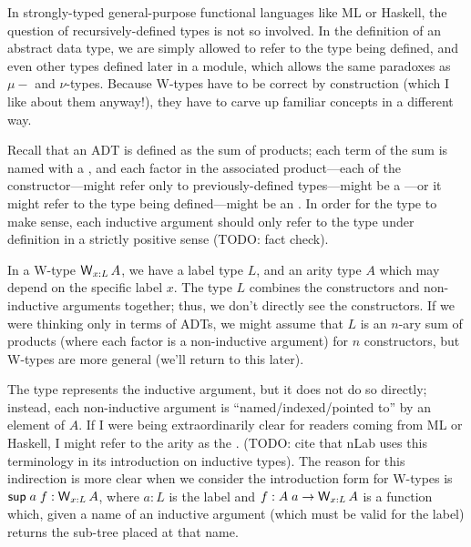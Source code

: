 \documentclass[11pt]{article} %
\theoremstyle{definition}
\theoremstyle{remark}
\newenvironment{aside}
  {\begin{mdframed}[style=0,%
      leftline=false,rightline=false,leftmargin=2em,rightmargin=2em,%
          innerleftmargin=0pt,innerrightmargin=0pt,linewidth=0.75pt,%
      skipabove=7pt,skipbelow=7pt]\small}
  {\end{mdframed}}
\begin{document}
\begin{aside}
  In strongly-typed general-purpose functional languages like ML or Haskell, the question of recursively-defined types is not so involved.
  In the definition of an abstract data type, we are simply allowed to refer to the type being defined, and even other types defined later in a module, which allows the same paradoxes as $\mu-$ and $\nu$-types.
  Because W-types have to be correct by construction (which I like about them anyway!), they have to carve up familiar concepts in a different way.

  Recall that an ADT is defined as the sum of products; each term of the sum is named with a , and each factor in the associated product---each  of the constructor---might refer only to previously-defined types---might be a ---or it might refer to the type being defined---might be an .
  In order for the type to make sense, each inductive argument should only refer to the type under definition in a strictly positive sense (TODO: fact check).

  In a W-type $\operatorname{\mathsf{W}}_{x:L}A$, we have a label type $L$, and an arity type $A$ which may depend on the specific label $x$.
  The  type $L$ combines the constructors and non-inductive arguments together; thus, we don't directly see the constructors.
  If we were thinking only in terms of ADTs, we might assume that $L$ is an $n$-ary sum of products (where each factor is a non-inductive argument) for $n$ constructors, but W-types are more general (we'll return to this later).

  The  type represents the inductive argument, but it does not do so directly; instead, each non-inductive argument is ``named/indexed/pointed to'' by an element of $A$.
  If I were being extraordinarily clear for readers coming from ML or Haskell, I might refer to the arity as the .
  (TODO: cite that nLab uses this terminology in its introduction on inductive types).
  The reason for this indirection is more clear when we consider the introduction form for W-types is $\mathsf{sup}\;a\;f : \operatorname{\mathsf{W}}_{x:L}A$, where $a : L$ is the label and $f : A\;a \to \operatorname{\mathsf{W}}_{x:L}A$ is a function which, given a name of an inductive argument (which must be valid for the label) returns the sub-tree placed at that name.
  

\end{aside}
\end{document}
